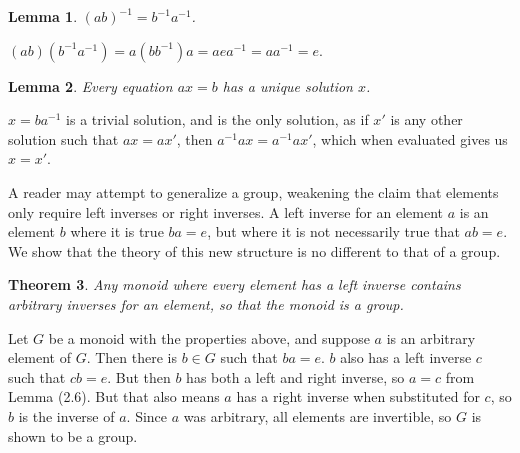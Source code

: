 \documentclass[12pt]{amsbook}
\makeatletter
\theoremstyle{plain}
\newtheorem{theorem}{Theorem}[chapter]
\newtheorem{lemma}[theorem]{Lemma}
\theoremstyle{definition}
\renewenvironment{proof}[1][\proofname]{\par
  \pushQED{\qed}%
  \normalfont \topsep6\p@\@plus6\p@\relax
  \list{}{\leftmargin=0em
          \rightmargin=\leftmargin
          \settowidth{\itemindent}{\itshape#1}%
          \labelwidth=\itemindent}

  \item[\hskip\labelsep
        \itshape
    #1\@addpunct{.}]\ignorespaces
}{%
  \popQED\endlist\@endpefalse
}
\makeatother
\begin{document}
\begin{lemma} $(ab)^{-1} = b^{-1}a^{-1}$. \end{lemma}
\begin{proof} $(ab)(b^{-1}a^{-1}) = a(bb^{-1})a = aea^{-1} = aa^{-1} = e$. \end{proof}

\begin{lemma} Every equation $ax = b$ has a unique solution $x$. \end{lemma}
\begin{proof} $x = ba^{-1}$ is a trivial solution, and is the only solution, as if $x'$ is any other solution such that $ax = ax'$, then $a^{-1}ax = a^{-1}ax'$, which when evaluated gives us $x = x'$.
\end{proof}

A reader may attempt to generalize a group, weakening the claim that elements only require left inverses or right inverses. A left inverse for an element $a$ is an element $b$ where it is true $ba = e$, but where it is not necessarily true that $ab = e$. We show that the theory of this new structure is no different to that of a group.

\begin{theorem}
    Any monoid where every element has a left inverse contains arbitrary inverses for an element, so that the monoid is a group.
\end{theorem}
\begin{proof}
    Let $G$ be a monoid with the properties above, and suppose $a$ is an arbitrary element of $G$. Then there is $b \in G$ such that $ba = e$. $b$ also has a left inverse $c$ such that $cb = e$. But then $b$ has both a left and right inverse, so $a = c$ from Lemma (2.6). But that also means $a$ has a right inverse when substituted for $c$, so $b$ is the inverse of $a$. Since $a$ was arbitrary, all elements are invertible, so $G$ is shown to be a group.
\end{proof}
\end{document}

